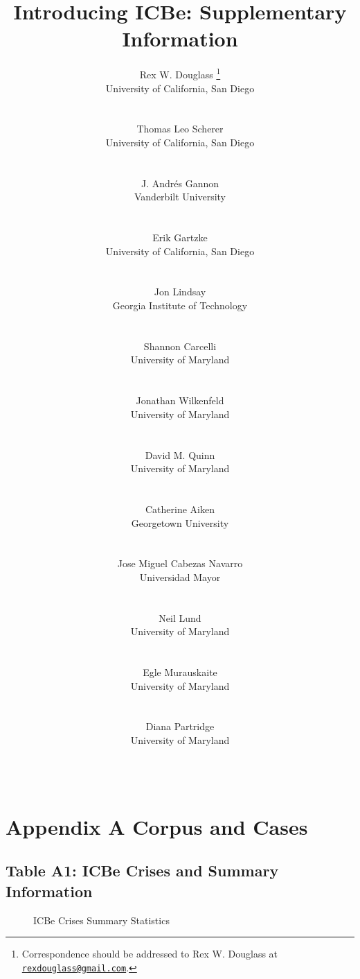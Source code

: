 \documentclass{article}
\title{Introducing ICBe: Supplementary Information}
\author{
    Rex W. Douglass
    \thanks{Correspondence should be addressed to Rex W. Douglass at
\href{mailto:rexdouglass@gmail.com}{\nolinkurl{rexdouglass@gmail.com}}.}
   \\
    University of California, San Diego \\
   \\
  \texttt{} \\
   \And
    Thomas Leo Scherer
   \\
    University of California, San Diego \\
   \\
  \texttt{} \\
   \And
    J. Andrés Gannon
   \\
    Vanderbilt University \\
   \\
  \texttt{} \\
   \And
    Erik Gartzke
   \\
    University of California, San Diego \\
   \\
  \texttt{} \\
   \And
    Jon Lindsay
   \\
    Georgia Institute of Technology \\
   \\
  \texttt{} \\
   \And
    Shannon Carcelli
   \\
    University of Maryland \\
   \\
  \texttt{} \\
   \And
    Jonathan Wilkenfeld
   \\
    University of Maryland \\
   \\
  \texttt{} \\
   \And
    David M. Quinn
   \\
    University of Maryland \\
   \\
  \texttt{} \\
   \And
    Catherine Aiken
   \\
    Georgetown University \\
   \\
  \texttt{} \\
   \And
    Jose Miguel Cabezas Navarro
   \\
    Universidad Mayor \\
   \\
  \texttt{} \\
   \And
    Neil Lund
   \\
    University of Maryland \\
   \\
  \texttt{} \\
   \And
    Egle Murauskaite
   \\
    University of Maryland \\
   \\
  \texttt{} \\
   \And
    Diana Partridge
   \\
    University of Maryland \\
   \\
  \texttt{} \\
  }
\begin{document}
\maketitle


\begin{abstract}

\end{abstract}


\newpage 
\tableofcontents 
\newpage

\clearpage

\hypertarget{appendix-a-corpus-and-cases}{%
\section{Appendix A Corpus and
Cases}\label{appendix-a-corpus-and-cases}}

\hypertarget{app:crises}{%
\subsection{Table A1: ICBe Crises and Summary
Information}\label{app:crises}}

\begin{figure}[H]
\caption{ICBe Crises Summary Statistics}
\end{figure}
\clearpage
\end{document}
